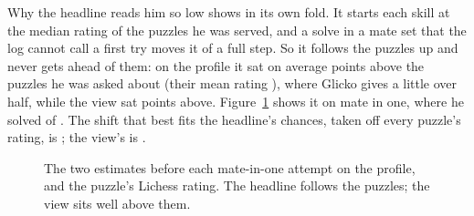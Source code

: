 \documentclass[11pt]{article}
\begin{document}
\begin{table}[!htbp]
\centering\small
\ReliabilityTable
\caption{The scored attempts binned by each estimate's solve chance.}
\label{tab:reliability}
\end{table}

\begin{table}[!htbp]
\centering\small
\BucketTable
\caption{Each bucket's scored attempts, the mean Lichess rating of its puzzles, the share solved
and each estimate's mean chance.}
\label{tab:buckets}
\end{table}

Why the headline reads him so low shows in its own fold. It starts each skill at the median rating
of the puzzles he was served, and a solve in a mate set that the log cannot call a first try moves
it \ObviousUnknownWin{} of a full step. So it follows the puzzles up and never gets ahead of them:
on the profile it sat on average \HeadAbove{} points above the puzzles he was asked about (their
mean rating \ItemMean), where Glicko gives a little over half, while the view sat \ViewAbove{}
points above. Figure~\ref{fig:mate} shows it on mate in one, where he solved \MateSolved{} of
\MateN. The shift that best fits the headline's chances, taken off every puzzle's rating, is
\PShiftHead; the view's is \PShiftView.

\begin{figure}[!htbp]
\centering
{}
\caption{The two estimates before each mate-in-one attempt on the profile, and the puzzle's
Lichess rating. The headline follows the puzzles; the view sits well above them.}
\label{fig:mate}
\end{figure}
\end{document}
